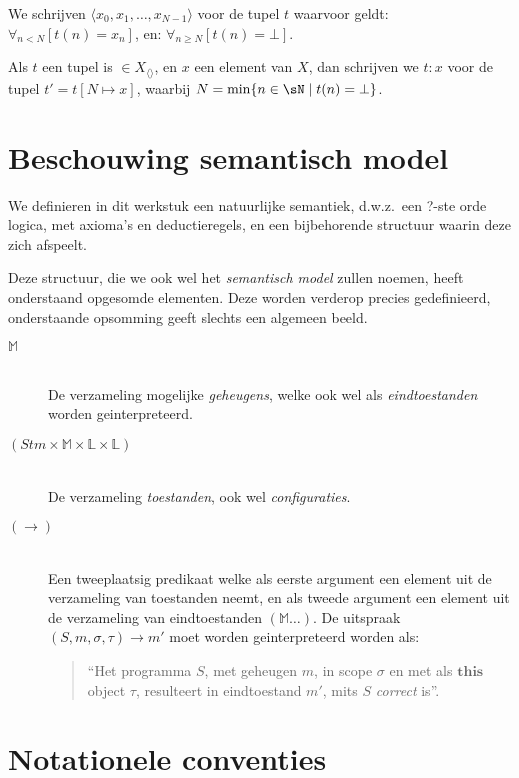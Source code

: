We schrijven $\langle x_0, x_1, \dots, x_{N-1}\rangle$ voor de tupel $t$ waarvoor geldt: $\forall_{n < N}[t(n) = x_n]$, en: $\forall_{n \ge N}[t(n) = \bot]$.

Als $t$ een tupel is $\in X_{\langle\rangle}$, en $x$ een element van $X$, dan schrijven we $t:x$ voor de tupel $t' = t[N \mapsto x]$, waarbij $N = \min\{n\in\sN \mid t(n) = \bot\}$.

\section{Beschouwing semantisch model}

We definieren in dit werkstuk een natuurlijke semantiek, d.w.z.~een ?-ste orde logica, met axioma's en deductieregels, en een bijbehorende structuur waarin deze zich afspeelt.

Deze structuur, die we ook wel het \emph{semantisch model} zullen noemen, heeft onderstaand opgesomde elementen. Deze worden verderop precies gedefinieerd, onderstaande opsomming geeft slechts een algemeen beeld.

\begin{description}
	\item[$\mathbb{M}$]\hfill\\ De verzameling mogelijke \emph{geheugens}, welke ook wel als \emph{eindtoestanden} worden geinterpreteerd.
	\item[$(\mathit{Stm} \times \mathbb{M} \times \mathbb{L} \times \mathbb{L})$]\hfill\\ De verzameling \emph{toestanden}, ook wel \emph{configuraties}.
	\item[$(\longrightarrow)$]\hfill\\ Een tweeplaatsig predikaat welke als eerste argument een element uit de verzameling van toestanden neemt, en als tweede argument een element uit de verzameling van eindtoestanden $(\mathbb{M}\dots)$. De uitspraak $(S, m, \sigma, \tau) \longrightarrow m'$ moet worden geinterpreteerd worden als:
	\begin{quote} ``Het programma $S$, met geheugen $m$, in scope $\sigma$ en met als $\mathbf{this}$ object $\tau$, resulteert in eindtoestand $m'$, mits $S$ \emph{correct} is''. \end{quote}
\end{description}

\section{Notationele conventies}

